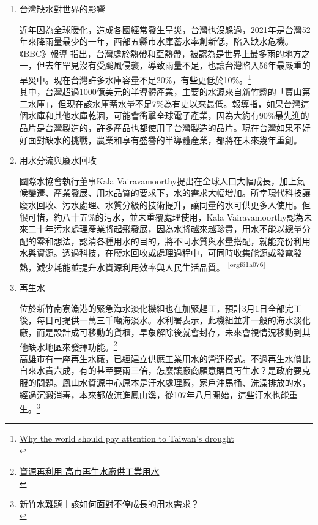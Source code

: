 \documentclass[a4paper,12pt]{article}
\begin{document}
\begin{enumerate}
\item 台灣缺水對世界的影響
\label{sec:org8279002}

近年因為全球暖化，造成各國經常發生旱災，台灣也沒躲過，2021年是台灣52年來降雨量最少的一年，西部五縣市水庫蓄水率創新低，陷入缺水危機。《BBC》報導 指出，台灣處於熱帶和亞熱帶，被認為是世界上最多雨的地方之一，但去年罕見沒有受颱風侵襲，導致雨量不足，也讓台灣陷入56年最嚴重的旱災中。現在台灣許多水庫容量不足20\%，有些更低於10\%。\footnote{\href{https://www.bbc.com/news/world-asia-56798308}{Why the world should pay attention to Taiwan's drought}\\}\\

其中，台灣超過1000億美元的半導體產業，主要的水源來自新竹縣的「寶山第二水庫」，但現在該水庫蓄水量不足7\%為有史以來最低。報導指，如果台灣這個水庫和其他水庫乾涸，可能會衝擊全球電子產業，因為大約有90\%最先進的晶片是台灣製造的，許多產品也都使用了台灣製造的晶片。現在台灣如果不好好面對缺水的挑戰，農業和享有盛譽的半導體產業，都將在未來幾年重創。\\

\item 用水分流與廢水回收
\label{sec:org1b57318}

國際水協會執行董事Kala Vairavamoorthy提出在全球人口大幅成長，加上氣候變遷、產業發展、用水品質的要求下，水的需求大幅增加。所幸現代科技讓廢水回收、污水處理、水質分級的技術提升，讓同量的水可供更多人使用。但很可惜，約八十五\%的污水，並未重覆處理使用，Kala Vairavamoorthy認為未來二十年污水處理產業將起飛發展，因為水將越來越珍貴，用水不能以總量分配的零和想法，認清各種用水的目的，將不同水質與水量搭配，就能充份利用水與資源。透過科技，在廢水回收或處理過程中，可同時收集能源或發電發熱，減少耗能並提升水資源利用效率與人民生活品質。 \textsuperscript{\ref{orgf51a076}}\\

\item 再生水
\label{sec:org82398e8}

位於新竹南寮漁港的緊急海水淡化機組也在加緊趕工，預計3月1日全部完工後，每日可提供一萬三千噸海淡水。水利署表示，此機組並非一般的海水淡化廠，而是設計成可移動的貨櫃，旱象解除後就會封存，未來會視情況移動到其他缺水地區來發揮功能。\footnote{\href{https://news.pts.org.tw/article/505049}{資源再利用 高市再生水廠供工業用水}\\\label{org5abd36c}}\\

高雄市有一座再生水廠，已經建立供應工業用水的營運模式。不過再生水價比自來水貴六成，有的甚至要兩三倍，怎麼讓廠商願意購買再生水？是政府要克服的問題。鳳山水資源中心原本是汙水處理廠，家戶沖馬桶、洗澡排放的水，經過沉澱消毒，本來都放流進鳳山溪，從107年八月開始，這些汙水也能重生。\footnote{\href{https://ourisland.pts.org.tw/content/7429}{新竹水難題｜該如何面對不停成長的用水需求？}\\}\\


\end{enumerate}
\end{document}
